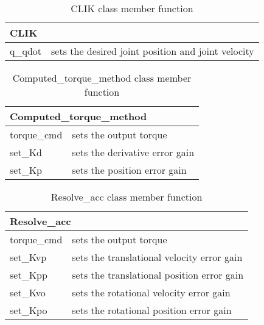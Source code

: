 \documentclass[11pt,fleqn,letterpaper]{report}
\begin{document}
\begin{table}[htbp]
\caption{CLIK class member function}
\label{tab:commandsum1e}
\begin{center}
\begin{tabular}{||l|l||}
\hline
\hline
\multicolumn{2}{||l||}{{\bf CLIK}} \\
\hline
\hline
q\_qdot & sets the desired joint position and joint velocity \\
\hline
\end{tabular}
\end{center}
\end{table}

\begin{table}[htbp]
\caption{Computed\_torque\_method class member function}
\label{tab:commandsum1f}
\begin{center}
\begin{tabular}{||l|l||}
\hline
\hline
\multicolumn{2}{||l||}{{\bf Computed\_torque\_method}} \\
\hline
\hline
torque\_cmd & sets the output torque \\
\hline
set\_Kd & sets the derivative error gain \\
\hline
set\_Kp & sets the position error gain \\
\hline
\end{tabular}
\end{center}
\end{table}

\begin{table}[htbp]
\caption{Resolve\_acc class member function}
\label{tab:commandsum1g}
\begin{center}
\begin{tabular}{||l|l||}
\hline
\hline
\multicolumn{2}{||l||}{{\bf Resolve\_acc}} \\
\hline
\hline
torque\_cmd & sets the output torque \\
\hline
set\_Kvp & sets the translational velocity error gain \\
\hline
set\_Kpp & sets the translational position error gain \\
\hline
set\_Kvo & sets the rotational velocity error gain \\
\hline
set\_Kpo & sets the rotational position error gain \\
\hline
\end{tabular}
\end{center}
\end{table}
\end{document}
